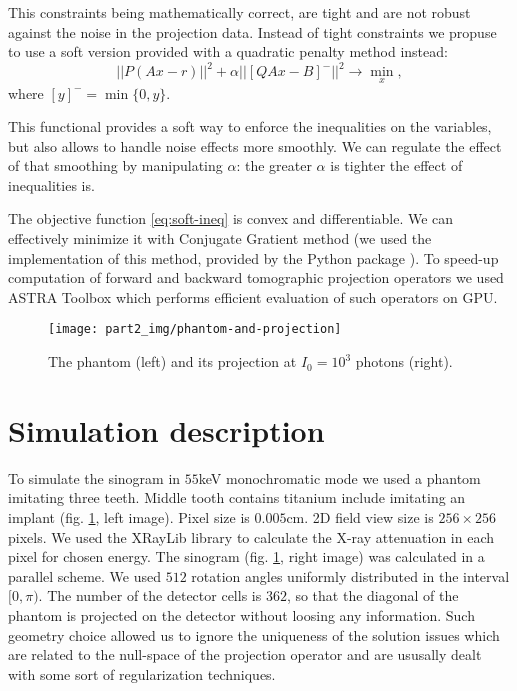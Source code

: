 This constraints being mathematically correct, are tight and are not robust against the noise in the projection data. Instead of tight constraints we propuse to use a soft version provided with a quadratic penalty method \cite{nocedal2006numerical} instead:
\begin{equation}
  \label{eq:soft-ineq}
  ||P(Ax - r)||^2 + \alpha ||[QAx - B]^-||^2 \to \min\limits_x,
\end{equation}
where $[y]^- = \min\{0, y\}$.

This functional provides a soft way to enforce the inequalities on the variables, but also allows to handle noise effects more smoothly. We can regulate the effect of that smoothing by manipulating $\alpha$: the greater $\alpha$ is tighter the effect of inequalities is.

The objective function \eqref{eq:soft-ineq} is convex and differentiable. We can effectively minimize it with Conjugate Gratient method (we used the implementation of this method, provided by the Python package \cite{scipy}). To speed-up computation of forward and backward tomographic projection operators we used ASTRA Toolbox \cite{palenstijn2011performance, van2015astra} which performs efficient evaluation of such operators on GPU.
\begin{figure}[h]
  \centering
  \texttt{[image: part2\_img/phantom-and-projection]}
  \caption{The phantom (left) and its projection at $I_0 = 10^3$ photons (right).}
  \label{phantom-and-projection}
\end{figure}

\section{Simulation description}
\label{s-phantom}
To simulate the sinogram in $55$keV monochromatic mode we used a phantom imitating three teeth. Middle tooth contains titanium include imitating an implant (fig. \ref{phantom-and-projection}, left image). Pixel size is $0.005$cm. 2D field view size is $256 \times 256$ pixels. We used the XRayLib library \cite{brunetti2004library, schoonjans2011xraylib} to calculate the X-ray attenuation in each pixel for chosen energy. The sinogram (fig. \ref{phantom-and-projection}, right image) was calculated in a parallel scheme. We used $512$ rotation angles uniformly distributed in the interval $[0, \pi)$. The number of the detector cells is $362$, so that the diagonal of the phantom is projected on the detector without loosing any information. Such geometry choice allowed us to ignore the uniqueness of the solution issues which are related to the null-space of the projection operator and are ususally dealt with some sort of regularization techniques.


